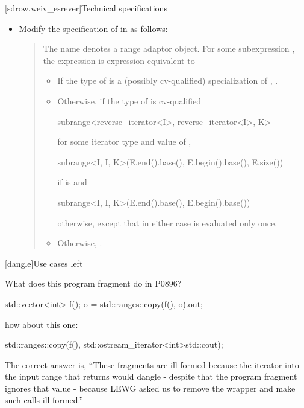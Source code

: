 [sdrow.weiv_esrever]{Technical specifications}

\begin{itemize}
\item Modify the specification of  in
   as follows:
  \begin{quote}
\pnum
The name  denotes a
range adaptor object.
For some subexpression , the expression
 is expression-equivalent to\added{:}
\begin{addedblock}
\begin{itemize}
\item If the type of  is a (possibly cv-qualified)
  specialization of , .
\item Otherwise, if the type of  is cv-qualified
  \begin{codeblock}
  subrange<reverse_iterator<I>, reverse_iterator<I>, K>
  \end{codeblock}
  for some iterator type  and
  value  of ,
  \begin{codeblock}
  subrange<I, I, K>(E.end().base(), E.begin().base(), E.size())
  \end{codeblock}
  if  is  and
  \begin{codeblock}
  subrange<I, I, K>(E.end().base(), E.begin().base())
  \end{codeblock}
  otherwise, except that in either case  is evaluated only once.
\item Otherwise, .
\end{itemize}
\end{addedblock}
  \end{quote}
\end{itemize}


[dangle]{Use cases left }

What does this program fragment do in P0896?
\begin{codeblock}
std::vector<int> f();
o = std::ranges::copy(f(), o).out;
\end{codeblock}
how about this one:
\begin{codeblock}
std::ranges::copy(f(), std::ostream_iterator<int>{std::cout});
\end{codeblock}
The correct answer is, ``These fragments are ill-formed because the iterator into
the input range that  returns would dangle - despite that
the program fragment ignores that value - because LEWG asked us to remove the
 wrapper and make such calls ill-formed.''

